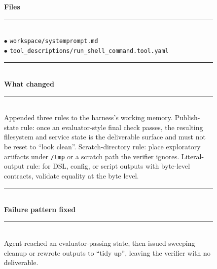 \begin{figure}[t]
    \centering
    \scriptsize
    \begin{tcbraster}[raster columns=2,
                      raster equal height,
                      raster column skip=4pt,
                      raster row skip=0pt,
                      raster left skip=0pt,
                      raster right skip=0pt,
                      boxrule=0.6pt,
                      left=4pt,right=4pt,top=3pt,bottom=3pt,
                      coltitle=white]
        \begin{tcolorbox}[colback=aheSky!18,colframe=aheNavy,colbacktitle=aheNavy,
                          title={\scriptsize\textbf{chg-7, iteration 5, commit \texttt{3ba3a90}, level: prompt + tool descriptor}}]
            \textbf{\textcolor{aheNavy}{Files}} \\
            \rule{\linewidth}{0.3pt}\\[1pt]
            $\bullet$ \texttt{workspace/systemprompt.md} \\
            $\bullet$ \texttt{tool\_descriptions/run\_shell\_command.tool.yaml} \\[3pt]
            \rule{\linewidth}{0.3pt}\\
            \textbf{\textcolor{aheNavy}{What changed}} \\
            \rule{\linewidth}{0.3pt}\\[1pt]
            Appended three rules to the harness's working memory. Publish-state rule: once an evaluator-style final check passes, the resulting filesystem and service state is the deliverable surface and must not be reset to ``look clean''. Scratch-directory rule: place exploratory artifacts under \texttt{/tmp} or a scratch path the verifier ignores. Literal-output rule: for DSL, config, or script outputs with byte-level contracts, validate equality at the byte level. \\[3pt]
            \rule{\linewidth}{0.3pt}\\
            \textbf{\textcolor{aheNavy}{Failure pattern fixed}} \\
            \rule{\linewidth}{0.3pt}\\[1pt]
            Agent reached an evaluator-passing state, then issued sweeping cleanup or rewrote outputs to ``tidy up'', leaving the verifier with no deliverable. \\[3pt]

\end{tcolorbox}
\end{tcbraster}
\end{figure}
